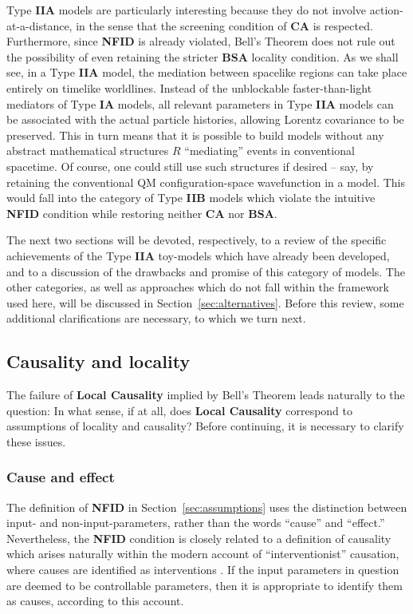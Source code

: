 \documentclass[rmp, aps, preprint, longbibliography]{revtex4-1}
\begin{document}
Type {\bf IIA} models are particularly interesting because they do not involve action-at-a-distance, in the sense that the screening condition of {\bf CA} is respected.  Furthermore, since {\bf NFID} is already violated, Bell's Theorem does not rule out the possibility of even retaining the stricter {\bf BSA} locality condition.  As we shall see, in a Type {\bf IIA} model, the mediation between spacelike regions can take place entirely on timelike worldlines.  Instead of the unblockable faster-than-light mediators of Type {\bf IA} models, all relevant parameters in Type {\bf IIA} models can be associated with the actual particle histories, allowing Lorentz covariance to be preserved.  This in turn means that it is possible to build models without any abstract mathematical structures $R$ ``mediating'' events in conventional spacetime.  Of course, one could still use such structures if desired -- say, by retaining the conventional QM configuration-space wavefunction in a model.  This would fall into the category of Type {\bf IIB} models which violate the intuitive {\bf NFID} condition while restoring neither {\bf CA} nor {\bf BSA}.

The next two sections will be devoted, respectively, to a review of the specific achievements of the Type {\bf IIA} toy-models which have already been developed, and to a discussion of the drawbacks and promise of this category of models.  The other categories, as well as approaches which do not fall within the framework used here, will be discussed in Section~\ref{sec:alternatives}.  Before this review, some additional clarifications are necessary, to which we turn next.


\subsection{Causality and locality}
\label{sec:more_assumptions}

The failure of {\bf Local Causality} implied by Bell's Theorem leads naturally to the question: In what sense, if at all, does {\bf Local Causality} correspond to assumptions of locality and causality?  Before continuing, it is necessary to clarify these issues.

\subsubsection{Cause and effect}
\label{sec:cause_effect}

The definition of {\bf NFID} in Section~\ref{sec:assumptions} uses the distinction between input- and non-input-parameters, rather than the words ``cause'' and ``effect.''  Nevertheless, the {\bf NFID} condition is closely related to a definition of causality which arises naturally within the modern account of ``interventionist'' causation, where causes are identified as interventions \cite{pearl2009,woodward2005}.    If the input parameters in question are deemed to be controllable parameters, then it is appropriate to identify them as causes, according to this account.
\end{document}
